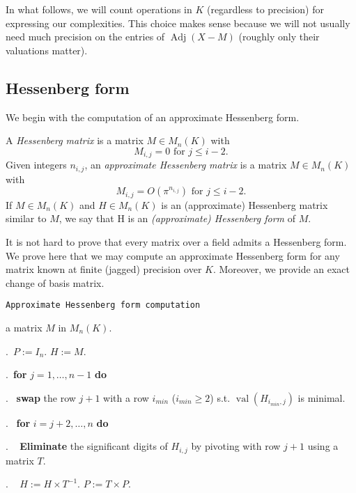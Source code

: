 \documentclass{sig-alternate-05-2015}
\DeclareMathOperator{\val}{val}
\DeclareMathOperator{\adj}{Adj}
\begin{document}
\begin{rem}
In what follows, we will count operations in $K$ (regardless to 
precision) for expressing our complexities. This choice makes sense 
because we will not usually need much precision on the entries of 
$\adj(X{-}M)$ (roughly only their valuations matter).
\end{rem}

\subsection{Hessenberg form}

We begin with the computation of
an approximate Hessenberg form.

\begin{deftn}
A \emph{Hessenberg matrix} is a matrix $M \in M_n(K)$ with
\[
M_{i,j}=0 \mbox{ for $j \le i-2$.}
\]
Given integers $n_{i,j}$, an \emph{approximate Hessenberg matrix}
is a matrix $M \in M_n(K)$ with
\[
M_{i,j} = O(\pi^{n_{i,j}}) \mbox{ for $j \le i-2$.}
\]
If $M \in M_n (K)$ and $H \in M_n (K)$ is an (approximate) Hessenberg matrix
similar to $M$, we say that H is an \emph{(approximate) Hessenberg form} of $M.$
\end{deftn}

It is not hard to prove that every matrix over a field admits
a Hessenberg form.
We prove here that we may compute an approximate Hessenberg form 
for any matrix known at finite (jagged) precision over $K$.
Moreover, we provide an exact change of basis matrix.

\noindent\hrulefill

 {\tt Approximate Hessenberg form computation}

 a matrix $M$ in $M_n(K).$

\smallskip

.\ $P:=I_n.$ \: $H:=M.$


.\ {\bf for} $j=1,\dots,n-1$ {\bf do} 

.\  \:  {\bf swap} the row $j+1$ with a row $i_{min}$ ($i_{min} \geq 2$) s.t. $\val(H_{i_{min},j})$ is minimal. 

.\  \:  {\bf for} $i=j+2,\dots,n$ {\bf do} 

. \ \: \:  \textbf{Eliminate} the significant digits of $H_{i,j}$ by pivoting with row $j+1$ 
using a matrix $T.$

. \ \: \:  $H:=H \times T^{-1}.$ \: $P:=T \times P.$
\end{document}

